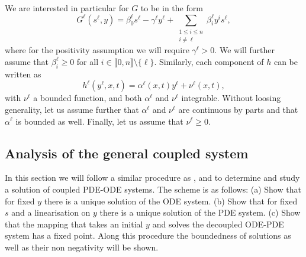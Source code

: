 \documentclass[11pt]{article}
\newcommand{\llb}{\llbracket}
\newcommand{\rrb}{\rrbracket}
\begin{document}
We are interested in particular for \(G\) to be in the form
\begin{equation}
\label{eq:form_of_G}
	G^\ell (s^\ell,y) = \beta_0^\ell s^\ell - \gamma^\ell y^\ell + \sum_{\substack{1\le i\le n\\ i\neq \ell}} \beta_i^\ell y^i s^\ell,
\end{equation}
where for the positivity assumption we will require \( \gamma^\ell > 0\). We will further assume that \(\beta_i^\ell \geq 0\) for all \(i \in \llb 0,n\rrb \setminus\{\ell\}\). Similarly, each component of \(h\) can be written as
\begin{equation}
\label{eq:form_of_h}
	h^\ell(y^\ell,x,t) = \alpha^\ell (x,t) y^\ell + \nu^\ell (x,t),
\end{equation}
with \(\nu^\ell \) a bounded function, and both \(\alpha^\ell \) and \(\nu^\ell \) integrable. Without loosing generality, let us assume further that \(\alpha^\ell \) and \(\nu^\ell \) are continuous by parts and that \(\alpha^\ell \) is bounded as well. Finally, let us assume that \( \nu^\ell \geq 0\).


\subsection{Analysis of the general coupled system}

In this section we will follow a similar procedure as \cite{Eisenhofer-2013,Ptashnyk-2010,Marciniak-2010}, and \cite{Ptashnyk-2016} to
determine and study a solution of coupled PDE-ODE systems. The scheme is as follows: (a) Show that for fixed \(y\) there is a unique solution of the ODE system. (b) Show that for fixed \(s\) and a linearisation on \(y\) there is a unique solution of the PDE system. (c) Show that the mapping that takes an initial \(y\) and solves the decoupled ODE-PDE system has a fixed point. 
Along this procedure the boundedness of solutions as well as their non negativity will be shown.
\end{document}

